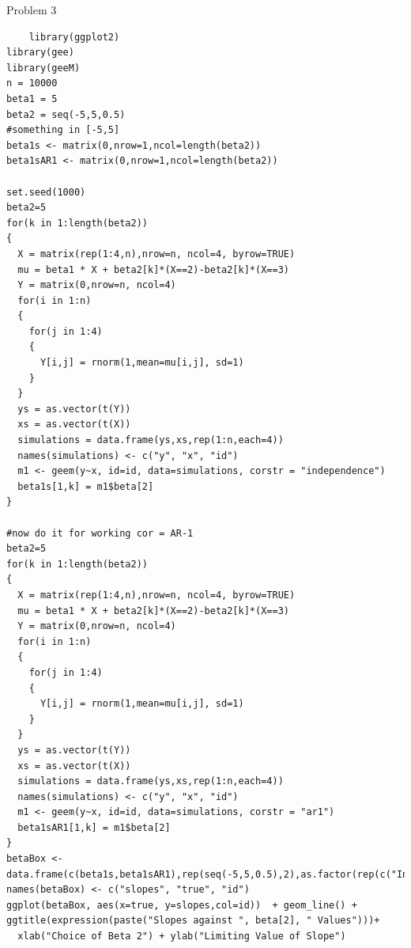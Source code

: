 \documentclass[11pt]{article}
\begin{document}
\newpage
Problem 3
\begin{verbatim}
	library(ggplot2)
library(gee)
library(geeM)
n = 10000
beta1 = 5
beta2 = seq(-5,5,0.5)
#something in [-5,5]
beta1s <- matrix(0,nrow=1,ncol=length(beta2))
beta1sAR1 <- matrix(0,nrow=1,ncol=length(beta2))

set.seed(1000)
beta2=5
for(k in 1:length(beta2))
{
  X = matrix(rep(1:4,n),nrow=n, ncol=4, byrow=TRUE)
  mu = beta1 * X + beta2[k]*(X==2)-beta2[k]*(X==3)
  Y = matrix(0,nrow=n, ncol=4)
  for(i in 1:n)
  {
    for(j in 1:4)
    {
      Y[i,j] = rnorm(1,mean=mu[i,j], sd=1)
    }
  }
  ys = as.vector(t(Y))
  xs = as.vector(t(X))
  simulations = data.frame(ys,xs,rep(1:n,each=4))
  names(simulations) <- c("y", "x", "id")
  m1 <- geem(y~x, id=id, data=simulations, corstr = "independence")
  beta1s[1,k] = m1$beta[2]
}

#now do it for working cor = AR-1
beta2=5
for(k in 1:length(beta2))
{
  X = matrix(rep(1:4,n),nrow=n, ncol=4, byrow=TRUE)
  mu = beta1 * X + beta2[k]*(X==2)-beta2[k]*(X==3)
  Y = matrix(0,nrow=n, ncol=4)
  for(i in 1:n)
  {
    for(j in 1:4)
    {
      Y[i,j] = rnorm(1,mean=mu[i,j], sd=1)
    }
  }
  ys = as.vector(t(Y))
  xs = as.vector(t(X))
  simulations = data.frame(ys,xs,rep(1:n,each=4))
  names(simulations) <- c("y", "x", "id")
  m1 <- geem(y~x, id=id, data=simulations, corstr = "ar1")
  beta1sAR1[1,k] = m1$beta[2]
}
betaBox <- data.frame(c(beta1s,beta1sAR1),rep(seq(-5,5,0.5),2),as.factor(rep(c("Indp","AR1"),each=length(beta2))))
names(betaBox) <- c("slopes", "true", "id")
ggplot(betaBox, aes(x=true, y=slopes,col=id))  + geom_line() + ggtitle(expression(paste("Slopes against ", beta[2], " Values")))+
  xlab("Choice of Beta 2") + ylab("Limiting Value of Slope")

\end{verbatim}
\end{document}
